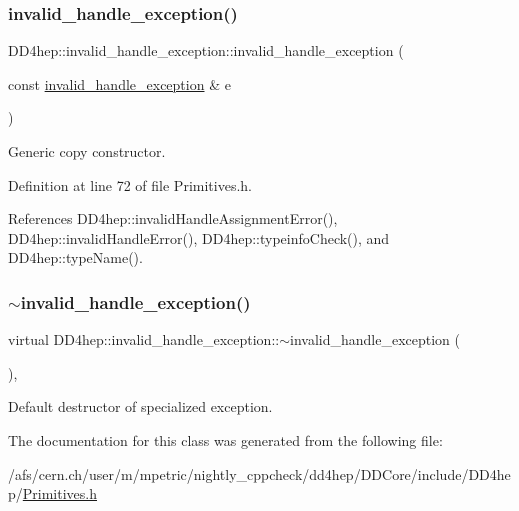 \subsubsection{\texorpdfstring{invalid\+\_\+handle\+\_\+exception()}{invalid\_handle\_exception()}\hspace{0.1cm}{\footnotesize\ttfamily [4/4]}}
{\footnotesize\ttfamily D\+D4hep\+::invalid\+\_\+handle\+\_\+exception\+::invalid\+\_\+handle\+\_\+exception (\begin{DoxyParamCaption}\item[{const \hyperlink{class_d_d4hep_1_1invalid__handle__exception}{invalid\+\_\+handle\+\_\+exception} \&}]{e }\end{DoxyParamCaption})\hspace{0.3cm}{\ttfamily [inline]}}



Generic copy constructor. 



Definition at line 72 of file Primitives.\+h.



References D\+D4hep\+::invalid\+Handle\+Assignment\+Error(), D\+D4hep\+::invalid\+Handle\+Error(), D\+D4hep\+::typeinfo\+Check(), and D\+D4hep\+::type\+Name().

\hypertarget{class_d_d4hep_1_1invalid__handle__exception_a7a035ad25b257272d737dfaa3ded4087}{}\label{class_d_d4hep_1_1invalid__handle__exception_a7a035ad25b257272d737dfaa3ded4087} 
\subsubsection{\texorpdfstring{$\sim$invalid\+\_\+handle\+\_\+exception()}{~invalid\_handle\_exception()}}
{\footnotesize\ttfamily virtual D\+D4hep\+::invalid\+\_\+handle\+\_\+exception\+::$\sim$invalid\+\_\+handle\+\_\+exception (\begin{DoxyParamCaption}{ }\end{DoxyParamCaption})\hspace{0.3cm}{\ttfamily [virtual]}, {\ttfamily [default]}}



Default destructor of specialized exception. 



The documentation for this class was generated from the following file\+:\begin{DoxyCompactItemize}
\item 
/afs/cern.\+ch/user/m/mpetric/nightly\+\_\+cppcheck/dd4hep/\+D\+D\+Core/include/\+D\+D4hep/\hyperlink{_primitives_8h}{Primitives.\+h}\end{DoxyCompactItemize}
